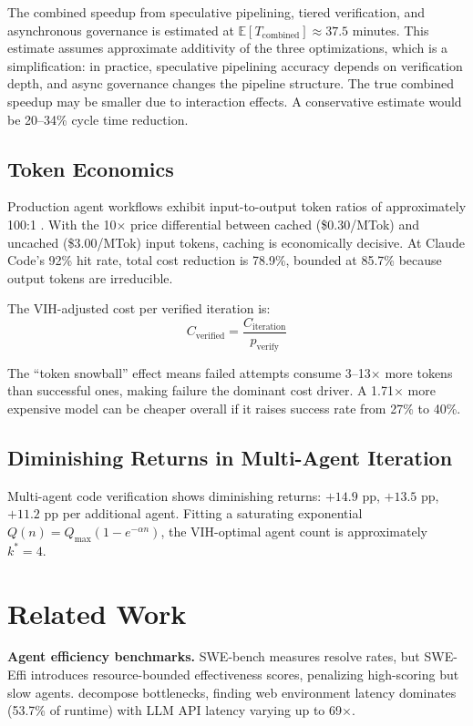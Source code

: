 \documentclass[11pt,a4paper]{article}
\theoremstyle{definition}
\theoremstyle{remark}
\newcommand{\E}{\mathbb{E}}
\begin{document}
The combined speedup from speculative pipelining, tiered verification, and asynchronous governance is estimated at $\E[T_{\mathrm{combined}}] \approx 37.5$ minutes. This estimate assumes approximate additivity of the three optimizations, which is a simplification: in practice, speculative pipelining accuracy depends on verification depth, and async governance changes the pipeline structure. The true combined speedup may be smaller due to interaction effects. A conservative estimate would be 20--34\% cycle time reduction.

\subsection{Token Economics}

Production agent workflows exhibit input-to-output token ratios of approximately 100:1 \citep{manus2025context}. With the 10$\times$ price differential between cached (\$0.30/MTok) and uncached (\$3.00/MTok) input tokens, caching is economically decisive. At Claude Code's 92\% hit rate, total cost reduction is 78.9\%, bounded at 85.7\% because output tokens are irreducible.

The VIH-adjusted cost per verified iteration is:
\[
    C_{\mathrm{verified}} = \frac{C_{\mathrm{iteration}}}{p_{\mathrm{verify}}}
\]

The ``token snowball'' effect \citep{sweeffi2025} means failed attempts consume 3--13$\times$ more tokens than successful ones, making failure the dominant cost driver. A 1.71$\times$ more expensive model can be cheaper overall if it raises success rate from 27\% to 40\%.

\subsection{Diminishing Returns in Multi-Agent Iteration}

Multi-agent code verification shows diminishing returns: $+14.9$ pp, $+13.5$ pp, $+11.2$ pp per additional agent. Fitting a saturating exponential $Q(n) = Q_{\max}(1 - e^{-\alpha n})$, the VIH-optimal agent count is approximately $k^* = 4$.


\section{Related Work}\label{sec:related}

\textbf{Agent efficiency benchmarks.} SWE-bench \citep{sweeffi2025} measures resolve rates, but SWE-Effi introduces resource-bounded effectiveness scores, penalizing high-scoring but slow agents. \citet{bian2025limits} decompose bottlenecks, finding web environment latency dominates (53.7\% of runtime) with LLM API latency varying up to 69$\times$.
\end{document}
